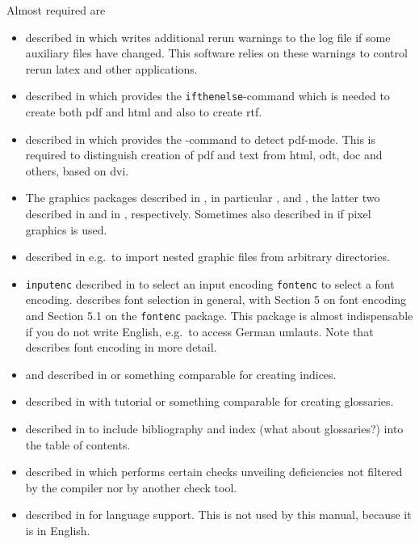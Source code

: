 \documentclass[12pt]{book}
\begin{document}
\noindent
Almost required are 
%
\begin{itemize}
\item
{} described in \cite{RerunFChkP} 
which writes additional rerun warnings to the log file 
if some auxiliary files have changed. 
This software relies on these warnings 
to control rerun latex and other applications. 
\item
{} described in \cite{IfThenP} 
which provides the \texttt{ifthenelse}-command 
which is needed to create both pdf and html and also to create rtf. 
\item
{} described in \cite{IfPdfP} 
which provides the -command to detect pdf-mode. 
This is required to distinguish creation of pdf and text 
from html, odt, doc and others, based on dvi. 
\item
The graphics packages described in \cite{GraX}, 
in particular ,  and , 
the latter two described in \cite{XColorP} and in \cite{TransP}, 
respectively. 
Sometimes also  described in \cite{BmpP} 
if pixel graphics is used. 
\item
{} described in \cite{ImpoP} 
e.g.~to import nested graphic files from arbitrary directories. 
\item
\texttt{inputenc} described in \cite{InputencP} 
to select an input encoding 
\texttt{fontenc} to select a font encoding. 
\cite{FontSel} describes font selection in general, 
with Section 5 on font encoding and 
Section 5.1 on the \texttt{fontenc} package. 
This package is almost indispensable if you do not write English, 
e.g.~to access German umlauts. 
Note that \cite{FontEnc} describes font encoding in more detail. 
\item 
{} and  described in \cite{MkidxShIdxP} 
or something comparable for creating indices. 
\item 
{} described in \cite{GloP} 
with tutorial \cite{GloPGuide}
or something comparable for creating glossaries. 
\item 
{} described in \cite{TocBibIndP} 
to include bibliography and index (what about glossaries?) 
into the table of contents. 
\item 
{} described in \cite{NagP} 
which performs certain checks unveiling deficiencies 
not filtered by the compiler nor by another check tool. 
\item 
{} described in \cite{BabelP} for language support. 
This is not used by this manual, because it is in English. 
\end{itemize}
\end{document}
